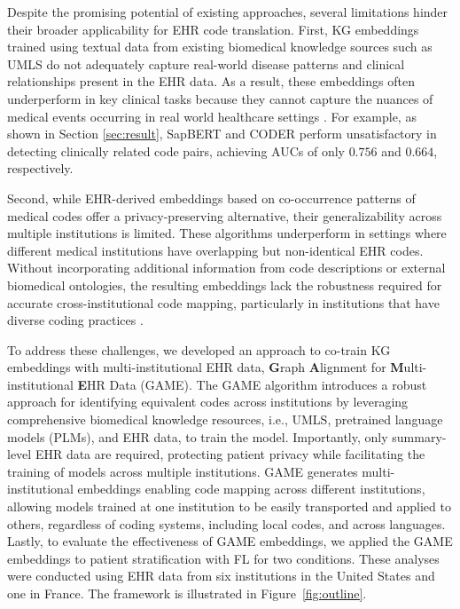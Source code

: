 \documentclass{article}
\begin{document}
Despite the promising potential of existing approaches, several limitations hinder their broader applicability for EHR code translation. First, KG embeddings trained using textual data from existing biomedical knowledge sources such as UMLS do not adequately capture real-world disease patterns and clinical relationships present in the EHR data. As a result, these embeddings often underperform in key clinical tasks because they cannot capture the nuances of medical events occurring in real world healthcare settings \cite{gan2023arch}. For example, as shown in Section \ref{sec:result}, SapBERT \citep{liu-2021-sapbert} and CODER \citep{yuan2022coder} perform unsatisfactory in detecting clinically related code pairs, achieving AUCs of only $0.756$ and $0.664$, respectively.


Second, while EHR-derived embeddings based on co-occurrence patterns of medical codes offer a privacy-preserving alternative, their generalizability across multiple institutions is limited. These algorithms underperform in settings where different medical institutions have overlapping but non-identical EHR codes. Without incorporating additional information from code descriptions or external biomedical ontologies, the resulting embeddings lack the robustness required for accurate cross-institutional code mapping, particularly in institutions that have diverse coding practices \citep{joint_learning, MIKGI}.



To address these challenges, we developed an approach to co-train KG embeddings with multi-institutional EHR data, \textbf{G}raph \textbf{A}lignment for \textbf{M}ulti-institutional \textbf{E}HR Data (GAME). The GAME algorithm introduces a robust approach for identifying equivalent codes across institutions by leveraging comprehensive biomedical knowledge resources, i.e., UMLS, pretrained language models (PLMs), and EHR data, to train the model. Importantly, only summary-level EHR data are required, protecting patient privacy while facilitating the training of models across multiple institutions. GAME generates multi-institutional embeddings enabling code mapping across different institutions, allowing models trained at one institution to be easily transported and applied to others, regardless of coding systems, including local codes, and across languages. Lastly, to evaluate the effectiveness of GAME embeddings, we applied the GAME embeddings to patient stratification with FL for two conditions. These analyses were conducted using EHR data from six institutions in the United States and one in France. The framework is illustrated in Figure~\ref{fig:outline}. 
\end{document}
